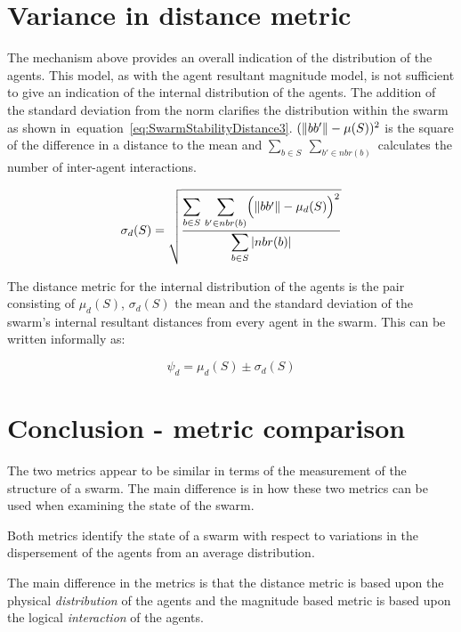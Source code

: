\section{Variance in distance metric}\label{Section:VarianceInDistance}
The mechanism above provides an overall indication of the distribution of the agents. This model, as with the agent resultant magnitude model, is not sufficient to give an indication of the internal distribution of the agents. The addition of the standard deviation from the norm clarifies the distribution within the swarm as shown in~equation~\ref{eq:SwarmStabilityDistance3}. $(\Vert{bb'}\Vert - \mu(S))^2$ is the square of the difference in a distance to the mean and $\sum_{b \in S}~\sum_{b' \in nbr(b)}$ calculates the number of inter-agent interactions.

\begin{equation}
\label{eq:SwarmStabilityDistance3}
\sigma_d(S) = \sqrt{\frac{\mathlarger{\sum_{b \in S}}~\mathlarger{\sum_{b' \in nbr(b)}}\Big(\magn{bb'} - \mu_d(S)\Big)^2}{\mathlarger{\sum_{b \in S}\card{nbr(b)}}}}
\end{equation}

The distance metric for the internal distribution of the agents is the pair consisting of $\mu_d(S)$, $\sigma_d(S)$ the mean and the standard deviation of the swarm's internal resultant distances from every agent in the swarm. This can be written informally as:

\begin{equation}
\label{eq:SwarmPotentialMagnitude}
\psi_d = \mu_d(S)\pm \sigma_d(S)
\end{equation}

\section{Conclusion - metric comparison\label{metric:MagnitudeDistanceComparison}}
The two metrics appear to be similar in terms of the measurement of the structure of a swarm. The main difference is in how these two metrics can be used when examining the state of the swarm.

Both metrics identify the state of a swarm with respect to variations in the dispersement of the agents from an average distribution. 

The main difference in the metrics is that the distance metric is based upon the physical \textit{distribution} of the agents and the magnitude based metric is based upon the logical \textit{interaction} of the agents.


